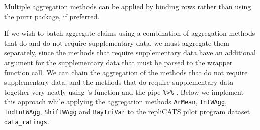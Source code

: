 \documentclass[article]{jss}
\newcommand{\fct}[1]{\code{#1()}}
\begin{document}
\begin{codelisting}

\caption{\label{lst-multi-method-workflow-non-supp}Multiple aggregation
methods can be applied by binding rows rather than using the purrr
package, if preferred.}


\end{codelisting}%

\begin{codelisting}

\caption{\label{lst-multi-method-workflow-both}If we wish to batch
aggregate claims using a combination of aggregation methods that do and
do not require supplementary data, we must aggregate them separately,
since the methods that require supplementary data have an additional
argument for the supplementary data that must be parsed to the wrapper
function call. We can chain the aggregation of the methods that do not
require supplementary data, and the methods that do require
supplementary data together very neatly using 's
\fct{bind_rows} function \citep{dplyr2021} and the \fct{magrittr} pipe
\texttt{\%\textgreater{}\%} \citep{magrittr2020}. Below we implement
this approach while applying the aggregation methods \texttt{ArMean},
\texttt{IntWAgg}, \texttt{IndIntWAgg}, \texttt{ShiftWAgg} and
\texttt{BayTriVar} to the repliCATS pilot program dataset
\texttt{data\_ratings}.}


\end{codelisting}%
\end{document}
